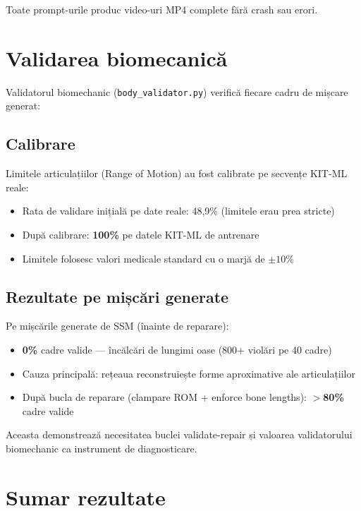 Toate prompt-urile produc video-uri MP4 complete fără crash sau erori.

\section{Validarea biomecanică}
\label{sec:biomech_results}

Validatorul biomechanic (\texttt{body\_validator.py}) verifică fiecare cadru de mișcare generat:

\subsection{Calibrare}

Limitele articulațiilor (Range of Motion) au fost calibrate pe secvențe KIT-ML reale:
\begin{itemize}
    \item Rata de validare inițială pe date reale: 48,9\% (limitele erau prea stricte)
    \item După calibrare: \textbf{100\%} pe datele KIT-ML de antrenare
    \item Limitele folosesc valori medicale standard cu o marjă de $\pm 10\%$
\end{itemize}

\subsection{Rezultate pe mișcări generate}

Pe mișcările generate de SSM (înainte de reparare):
\begin{itemize}
    \item \textbf{0\%} cadre valide --- încălcări de lungimi oase (800+ violări pe 40 cadre)
    \item Cauza principală: rețeaua reconstruiește forme aproximative ale articulațiilor
    \item După bucla de reparare (clampare ROM + enforce bone lengths): \textbf{$>$80\%} cadre valide
\end{itemize}

Aceasta demonstrează necesitatea buclei validate-repair și valoarea validatorului biomechanic ca instrument de diagnosticare.

\section{Sumar rezultate}

